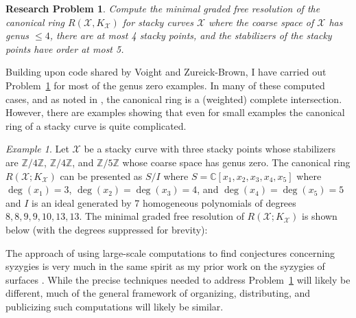 \documentclass[11pt,reqno]{amsart}
\newtheorem{problem}[lemma]{Research Problem}
\theoremstyle{remark}
\newtheorem{example}[lemma]{Example}
\newcommand{\CC}{\mathbb{C}}
\newcommand{\ZZ}{\mathbb{Z}}
\newcommand{\cX}{\mathcal{X}}
\begin{document}
\begin{problem}\label{prob:comp-canonical-stacky}
	Compute the minimal graded free resolution of the canonical ring $R(\cX, K_{\cX})$ for stacky curves $\cX$ where the coarse space of $\cX$ has genus $\leq 4$, there are at most 4 stacky points, and the stabilizers of the stacky points have order at most 5.
\end{problem}

Building upon code shared by Voight and Zureick-Brown, I have carried out Problem~\ref{prob:comp-canonical-stacky} for most of the genus zero examples. In many of these computed cases, and as noted in \cite[Appendix]{voightZurieckBrown22}, the canonical ring is a (weighted) complete intersection. However, there are examples showing that even for small examples the canonical ring of a stacky curve is quite complicated.

\begin{example}
Let $\cX$ be a stacky curve with three stacky points whose stabilizers are $\ZZ/4\ZZ$, $\ZZ/4\ZZ$, and $\ZZ/5\ZZ$ whose coarse space has genus zero. The canonical ring $R(\cX;K_{\cX})$ can be presented as $S/I$ where $S=\CC[x_{1},x_{2},x_{3},x_{4},x_{5}]$ where $\deg(x_{1})=3$, $\deg(x_{2})=\deg(x_{3})=4$, and $\deg(x_{4})=\deg(x_{5})=5$ and $I$ is an ideal generated by 7 homogeneous polynomials of degrees $8,8,9,9,10,13,13$. The minimal graded free resolution of $R(\cX;K_{\cX})$ is shown below (with the degrees suppressed for brevity):
\begin{center}
\end{center}
\end{example}

The approach of using large-scale computations to find conjectures concerning syzygies is very much in the same spirit as my prior work on the syzygies of surfaces \cite{BEGY20,BCEGLY22}. While the precise techniques needed to address Problem~\ref{prob:comp-canonical-stacky} will likely be different, much of the general framework of organizing, distributing, and publicizing such computations will likely be similar. 
\end{document}
